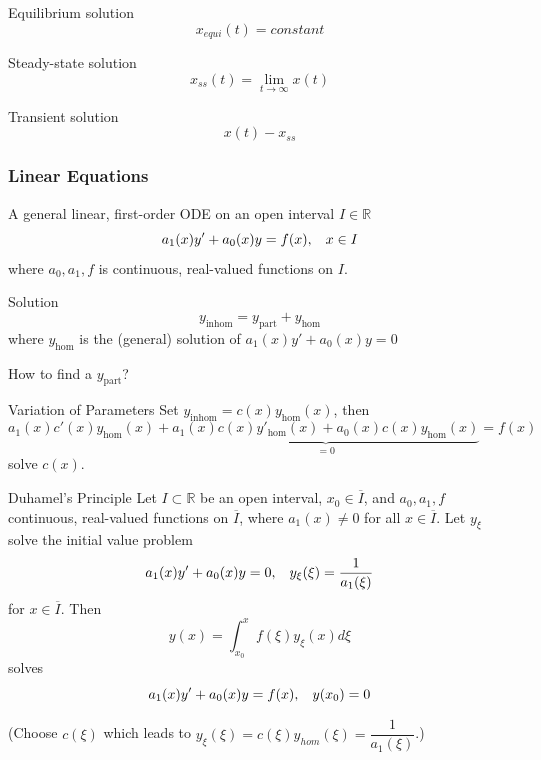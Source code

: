 \documentclass{beamer}
\begin{document}
\begin{frame}
\begin{block}{Equilibrium solution}
$$x_{equi}(t)=constant$$
\end{block}

\begin{block}{Steady-state solution}
$$x_{ss}(t)=\lim_{t\rightarrow\infty}x(t)$$
\end{block}

\begin{block}{Transient solution}
$$x(t)-x_{ss}$$
\end{block}
\end{frame}


\begin{frame}
\frametitle{Linear Equations}
A general linear, first-order ODE on an open interval $I\in\mathbb{R}$
$$a_1(x)y'+a_0(x)y=f(x),\hspace{3mm}x\in I $$
where $a_0,a_1,f$ is continuous, real-valued functions on $I$.
\end{frame}

\begin{frame}
\begin{block}{Solution}
$$y_{\text{inhom}}=y_{\text{part}}+y_{\text{hom}}$$
where 
$y_{\text{hom}}$ is the (general) solution of $a_1(x)y'+a_0(x)y=0$
\end{block}
\begin{block}{How to find a $y_{\text{part}}$?}
\end{block}
\end{frame}

\begin{frame}
\begin{block}{Variation of Parameters}
Set $y_{\text{inhom}}=c(x)y_{\text{hom}}(x)$, then
$$a_1(x)c'(x)y_{\text{hom}}(x)+\underbrace{a_1(x)c(x)y'_{\text{hom}}(x)+a_0(x)c(x)y_{\text{hom}}(x)}_{=0}=f(x)$$
solve $c(x)$.
\end{block}
\end{frame}

\begin{frame}
\begin{block}{Duhamel's Principle}
Let $I\subset\mathbb{R}$ be an open interval, $x_0\in\overline{I}$, and $a_0,a_1,f$ continuous, real-valued functions on $\overline{I}$, where $a_1(x)\neq0$ for all $x\in\overline{I}$. Let $y_{\xi}$ solve the initial value problem
$$a_1(x)y'+a_0(x)y=0,\hspace{3mm}y_{\xi}(\xi)=\dfrac{1}{a_1(\xi)}$$
for $x\in\overline{I}$. Then
$$y(x)=\int_{x_0}^xf(\xi)y_{\xi}(x)d\xi$$
solves
$$a_1(x)y'+a_0(x)y=f(x),\hspace{3mm}y(x_0)=0$$
\end{block}
\begin{block}{}
(Choose $c(\xi)$ which leads to $y_{\xi}(\xi)=c(\xi)y_{hom}(\xi)=\dfrac{1}{a_1(\xi)}$.)
\end{block}
\end{frame}
\end{document}
